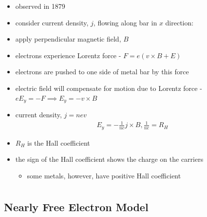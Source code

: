 \documentclass[a4paper,11pt,normalem]{article}
\begin{document}
\begin{itemize}
    \item observed in 1879
    \item consider current density, \(j\), flowing along bar in \(x\) direction:
    \item apply perpendicular magnetic field, \(B\)
    \item electrons experience Lorentz force - \(F = e(v\times B + E)\)
    \item electrons are pushed to one side of metal bar by this force
    \item electric field will compensate for motion due to Lorentz force - \(eE_y = -F \implies E_y = -v\times B\)
    \item current density, \(j = nev\)
        \begin{align*}
            E_y = -\frac{1}{ne}j\times B, \frac{1}{ne} = R_H
        \end{align*}
    \item \(R_H\) is the Hall coefficient
    \item the sign of the Hall coefficient shows the charge on the carriers
        \begin{itemize}
            \item some metals, however, have positive Hall coefficient
        \end{itemize}
\end{itemize}

\section{}
\subsection{Nearly Free Electron Model}
\end{document}
